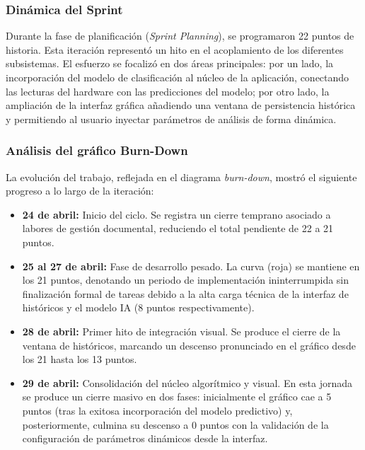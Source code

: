 \subsubsection{Dinámica del Sprint}
Durante la fase de planificación (\textit{Sprint Planning}), se programaron 22 puntos de historia. Esta iteración representó un hito en el acoplamiento de los diferentes subsistemas. El esfuerzo se focalizó en dos áreas principales: por un lado, la incorporación del modelo de clasificación al núcleo de la aplicación, conectando las lecturas del hardware con las predicciones del modelo; por otro lado, la ampliación de la interfaz gráfica añadiendo una ventana de persistencia histórica y permitiendo al usuario inyectar parámetros de análisis de forma dinámica.

\subsubsection{Análisis del gráfico Burn-Down}

La evolución del trabajo, reflejada en el diagrama \textit{burn-down}, mostró el siguiente progreso a lo largo de la iteración:

\begin{itemize}
    \item \textbf{24 de abril:} Inicio del ciclo. Se registra un cierre temprano asociado a labores de gestión documental, reduciendo el total pendiente de 22 a 21 puntos.
    \item \textbf{25 al 27 de abril:} Fase de desarrollo pesado. La curva (roja) se mantiene en los 21 puntos, denotando un periodo de implementación ininterrumpida sin finalización formal de tareas debido a la alta carga técnica de la interfaz de históricos y el modelo IA (8 puntos respectivamente).
    \item \textbf{28 de abril:} Primer hito de integración visual. Se produce el cierre de la ventana de históricos, marcando un descenso pronunciado en el gráfico desde los 21 hasta los 13 puntos.
    \item \textbf{29 de abril:} Consolidación del núcleo algorítmico y visual. En esta jornada se produce un cierre masivo en dos fases: inicialmente el gráfico cae a 5 puntos (tras la exitosa incorporación del modelo predictivo) y, posteriormente, culmina su descenso a 0 puntos con la validación de la configuración de parámetros dinámicos desde la interfaz.
\end{itemize}


